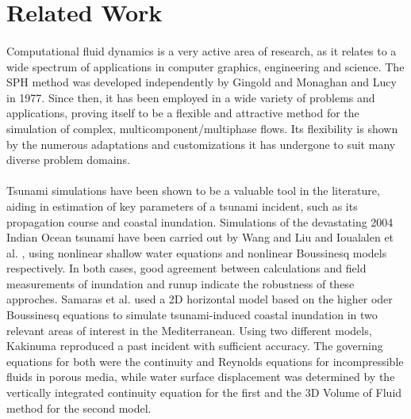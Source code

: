 \documentclass{llncs}
\begin{document}
\section{Related Work}

\paragraph{} Computational fluid dynamics is a very active area of research, as it relates
to a wide spectrum of applications in computer graphics, engineering and science. The SPH
method was developed independently by Gingold and Monaghan \cite{gingold1977375} and Lucy
\cite{lucy19771013} in 1977. Since then, it has been employed in a wide variety of
problems and applications, proving itself to be a flexible and attractive method for the
simulation of complex, multicomponent/multiphase flows. Its flexibility is shown by the
numerous adaptations and customizations it has undergone to suit many diverse problem
domains.

\paragraph{} Tsunami simulations have been shown to be a valuable tool in the literature,
aiding in estimation of key parameters of a tsunami incident, such as its propagation
course and coastal inundation. Simulations of the devastating 2004 Indian Ocean tsunami
have been carried out by Wang and Liu \cite{wang2007} and Ioualalen et
al. \cite{ioualalen2007}, using nonlinear shallow water equations and nonlinear Boussinesq
models respectively. In both cases, good agreement between calculations and field
measurements of inundation and runup indicate the robustness of these approches. Samaras
et al. \cite{samaras2015} used a 2D horizontal model based on the higher oder Boussinesq
equations to simulate tsunami-induced coastal inundation in two relevant areas of interest
in the Mediterranean. Using two different models, Kakinuma \cite{kakinuma2008} reproduced
a past incident with sufficient accuracy. The governing equations for both were the
continuity and Reynolds equations for incompressible fluids in porous media, while water
surface displacement was determined by the vertically integrated continuity equation for
the first and the 3D Volume of Fluid method for the second model.
\end{document}

